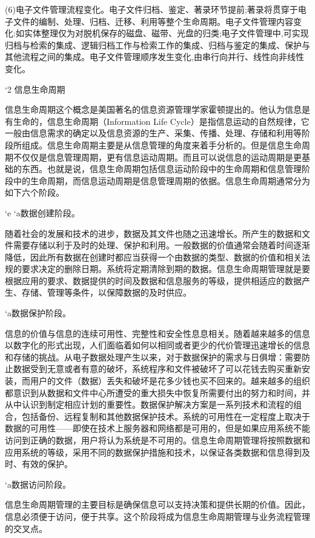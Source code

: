     (6)电子文件管理流程变化。电子文件归档、鉴定、著录环节提前;著录将贯穿于电子文件的编制、处理、归档、迁移、利用等整个生命周期。电子文件管理内容变化:如实体整理仅为对脱机保存的磁盘、磁带、光盘的归类;电子文件管理中,可实现归档与检索的集成、逻辑归档工作与检索工作的集成、归档与鉴定的集成、保护与其他流程之间的集成。电子文件管理顺序发生变化,由串行向并行、线性向非线性变化。


`2 信息生命周期

    信息生命周期这个概念是美国著名的信息资源管理学家霍顿提出的。他认为信息是有生命的，信息生命周期（Information Life Cycle）是指信息运动的自然规律，它一般由信息需求的确定以及信息资源的生产、采集、传播、处理、存储和利用等阶段所组成。信息生命周期主要是从信息管理的角度来着手分析的。但是信息生命周期不仅仅是信息管理周期，更有信息运动周期。而且可以说信息的运动周期是更基础的东西。也就是说，信息生命周期包括信息运动阶段中的生命周期和信息管理阶段中的生命周期，而信息运动周期是信息管理周期的依据。信息生命周期通常分为如下六个阶段。

    `e
        `a数据创建阶段。

        随着社会的发展和技术的进步，数据及其文件也随之迅速增长。所产生的数据和文件需要存储以利于及时的处理、保护和利用。一般数据的价值通常会随着时间逐渐降低，因此所有数据在创建时都应当获得一个由数据的类型、数据的价值和相关法规的要求决定的删除日期。系统将定期清除到期的数据。信息生命周期管理就是要根据应用的要求、数据提供的时间及数据和信息服务的等级，提供相适应的数据产生、存储、管理等条件，以保障数据的及时供应。

        `a数据保护阶段。

        信息的价值与信息的连续可用性、完整性和安全性息息相关。随着越来越多的信息以数字化的形式出现，人们面临着如何以相同或者更少的代价管理迅速增长的信息和存储的挑战。从电子数据处理产生以来，对于数据保护的需求与日俱增：需要防止数据受到无意或者有意的破坏，系统程序和文件被破坏了可以花钱去购买重新安装，而用户的文件（数据）丢失和破坏是花多少钱也买不回来的。越来越多的组织都意识到从数据和文件中心所遭受的重大损失中恢复所需要付出的努力和时间，并从中认识到制定相应计划的重要性。数据保护解决方案是一系列技术和流程的组合，包括备份、远程复制和其他数据保护技术。系统的可用性在一定程度上取决于数据的可用性——即使在技术上服务器和网络都是可用的，但是如果应用系统不能访问到正确的数据，用户将认为系统是不可用的。信息生命周期管理将按照数据和应用系统的等级，采用不同的数据保护措施和技术，以保证各类数据和信息得到及时、有效的保护。

        `a数据访问阶段。

        信息生命周期管理的主要目标是确保信息可以支持决策和提供长期的价值。因此，信息必须便于访问，便于共享。这个阶段将成为信息生命周期管理与业务流程管理的交叉点。

